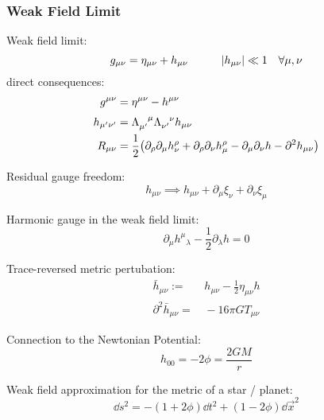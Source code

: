 		\subsubsection{Weak Field Limit}
			Weak field limit:
			\begin{equation}
				g_{\mu\nu} = \eta_{\mu\nu} + h_{\mu\nu} \hspace{30pt} \abs{h_{\mu\nu}} \ll 1 \quad \forall \mu,\nu
			\end{equation}
			direct consequences:
			\begin{equation}
				\begin{aligned}
					g^{\mu\nu} &= \eta^{\mu\nu} - h^{\mu\nu} \\
					h_{\mu'\nu'} &= \Lambda_{\mu'}^{\phantom{\mu'}\mu} \Lambda_{\nu'}^{\phantom{\nu'}\nu} h_{\mu\nu} \\
					R_{\mu\nu} &= \frac{1}{2}\qty(\partial_\rho \partial_\mu h_{\nu}^{\rho} + \partial_\rho \partial_\nu h_{\mu}^{\rho} - \partial_\mu \partial_\nu h - \partial^2 h_{\mu\nu}) \\
				\end{aligned}
			\end{equation}

			\noindent
			Residual gauge freedom:
			\begin{equation}
				h_{\mu\nu} \implies h_{\mu\nu} + \partial_\mu \xi_\nu + \partial_\nu \xi_\mu
			\end{equation}

			\noindent
			Harmonic gauge in the weak field limit:
			\begin{equation}
				\partial_\mu h^\mu{}_\lambda - \frac{1}{2}\partial_\lambda h = 0
			\end{equation}

			\noindent
			Trace-reversed metric pertubation:
			\begin{equation}
				\begin{aligned}
					\bar{h}_{\mu\nu} :=&\, h_{\mu\nu} - \frac{1}{2} \eta_{\mu\nu} h \\
					\partial^2 \bar{h}_{\mu\nu} =&\, -16\pi G T_{\mu\nu}
				\end{aligned}
			\end{equation}

			\noindent
			Connection to the Newtonian Potential:
			\begin{equation}
				h_{00} = -2\phi = \frac{2GM}{r}
			\end{equation}

			\noindent
			Weak field approximation for the metric of a star / planet:
			\begin{equation}
				\dd{s}^2 = -(1+2\phi)\dd{t}^2 + (1-2\phi)\dd{\vec{x}}^2
			\end{equation}

